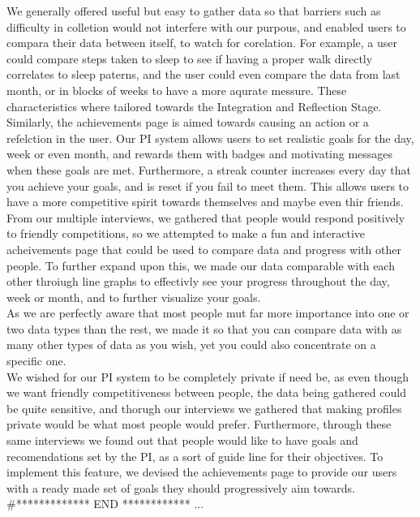 \documentclass[12pt]{article}
\begin{document}
We generally offered useful but easy to gather data so that barriers such as difficulty in colletion would not interfere with our purpous,  and enabled users to compara their data between itself,  to watch for corelation.  For example,  a user could compare steps taken to sleep to see if having a proper walk directly correlates to sleep paterns,  and the user could even compare the data from last month, or in blocks of weeks to have a more aqurate messure.  These characteristics where tailored towards the Integration and Reflection Stage.  \\

Similarly,  the achievements page is aimed towards causing an action or a refelction in the user.  Our PI system allows users to set realistic goals for the day,  week or even month,  and rewards them with badges and motivating messages when these goals are met. Furthermore,  a streak counter increases every day that you achieve your goals,  and is reset if you fail to meet them.  This allows users to have a more competitive spirit towards themselves and maybe even thir friends.\\

From our multiple interviews, we gathered that people would respond positively to friendly competitions,  so we attempted to make a fun and interactive acheivements page that could be used to compare data and progress with other people.  To further expand upon this,  we made our data comparable with each other throiugh line graphs to effectivly see your progress throughout the day,  week or month,  and to further visualize your goals. \\

As we are perfectly aware that most people mut far more importance into one or two data types than the rest, we made it so that you can compare data with as many other types of data as you wish,  yet you could also concentrate on a specific one. \\

We wished for our PI system to be completely private if need be,  as even though we want friendly competitiveness between people,  the data being gathered could be quite sensitive,  and thorugh our interviews we gathered that making profiles private would be what most people would prefer.  Furthermore,  through these same interviews we found out that people would like to have goals and recomendations set by the PI,  as a sort of guide line for their objectives.  To implement this feature,  we devised the achievements page to provide our users with a ready made set of goals they should progressively aim towards.\\
#************* END ************
...\\
\end{document}

